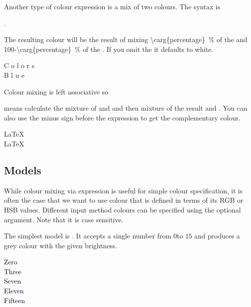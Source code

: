 Another type of colour expression is a mix of two colours. The syntax is
\begin{code}
  .
\end{code}
The resulting colour will be the result of mixing
\qty[parse-numbers=false]{\carg{percentage}}{\percent} of the  and \qty[parse-numbers=false]{100-\carg{percentage}}{\percent} of the
. If you omit the  it defaults to white.
\begin{example}
\textcolor{green!100!red}{C}%
\textcolor{green!80!red}{o}%
\textcolor{green!60!red}{l}%
\textcolor{green!40!red}{o}%
\textcolor{green!20!red}{r}%
\textcolor{green!0!red}{s} \\
\textcolor{blue!100}{B}%
\textcolor{blue!75}{l}%
\textcolor{blue!50}{u}%
\textcolor{blue!25}{e}
\end{example}
Colour mixing is left associative so
\begin{code}
\end{code}
means calculate the mixture of  and  and then mixture of the
result and . You can also use the minus sign before the expression to
get the complementary colour.
\begin{example}
\color{green!20!red!60!blue}
\LaTeX{} \\
\color{-green!20!red!60!blue}
\LaTeX{}
\end{example}

\subsection{Models}

While colour mixing via expression is useful for simple colour specification, it
is often the case that we want to use colour that is defined in terms of its RGB
or HSB values. Different input method colours can be specified using the optional
 argument. Note that it is case sensitive.

The simplest model is . It accepts a single number from \(0\)to
\(15\) and produces a grey colour with the given brightness.
\begin{example}
\textcolor[Gray]{0}{Zero}    \\
\textcolor[Gray]{3}{Three}   \\
\textcolor[Gray]{7}{Seven}   \\
\textcolor[Gray]{11}{Eleven} \\
\textcolor[Gray]{15}{Fifteen}
\end{example}

